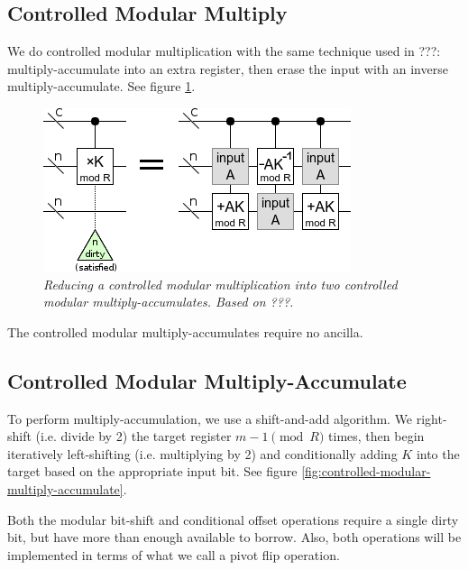 \documentclass[twocolumn]{article}
\begin{document}
\subsection{Controlled Modular Multiply}

We do controlled modular multiplication with the same technique used in ???: multiply-accumulate into an extra register, then erase the input with an inverse multiply-accumulate.
See figure \ref{fig:controlled-modular-multiply}.

\begin{figure}
  \centering
  \includegraphics[width=\linewidth]{assets/controlled-modular-multiply.png}
  \caption{\em
    Reducing a controlled modular multiplication into two controlled modular multiply-accumulates.
    Based on ???.
  }
  \label{fig:controlled-modular-multiply}
\end{figure}

The controlled modular multiply-accumulates require no ancilla.

\subsection{Controlled Modular Multiply-Accumulate}

To perform multiply-accumulation, we use a shift-and-add algorithm.
We right-shift (i.e. divide by 2) the target register $m-1 {\pmod R}$ times, then begin iteratively left-shifting (i.e. multiplying by 2) and conditionally adding $K$ into the target based on the appropriate input bit.
See figure \ref{fig:controlled-modular-multiply-accumulate}.

Both the modular bit-shift and conditional offset operations require a single dirty bit, but have more than enough available to borrow.
Also, both operations will be implemented in terms of what we call a pivot flip operation.
\end{document}
